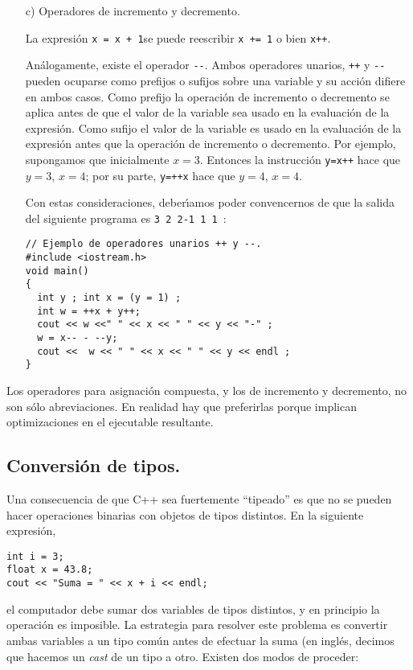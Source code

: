 \begin{enumerate}
La expresi{\'o}n \quad \verb!x = x + 2!\quad se puede reemplazar por \quad
\verb!x += 2!.

Existen los operadores \quad \verb|+=    -=    *=    /=|

\item[c)] Operadores de incremento y decremento.

La expresi{\'o}n \quad \verb|x = x + 1|\quad se puede reescribir \quad
\verb|x += 1| \quad o bien \quad \verb|x++|.

An{\'a}logamente, existe el operador \verb+--+. Ambos operadores unarios,
\verb|++| y \verb|--| pueden ocuparse como prefijos o sufijos sobre
una variable y su acci{\'o}n difiere en ambos casos. Como prefijo la
operaci{\'o}n de incremento o decremento se aplica antes de que el valor
de la variable sea usado en la evaluaci{\'o}n de la expresi{\'o}n. Como sufijo
el valor de la variable es usado en la evaluaci{\'o}n de la expresi{\'o}n
antes que la operaci{\'o}n de incremento o decremento. 
Por ejemplo, supongamos que inicialmente
$x=3$. Entonces la instrucci\'on \verb-y=x++- hace que $ y=3$, $x
=4$; por su parte, \verb-y=++x- hace que $y=4$, $x=4$.

Con estas consideraciones, deber\'{\i}amos poder convencernos de que
la salida del siguiente programa es \verb+3 2 2-1 1 1 +:
\begin{verbatim}
// Ejemplo de operadores unarios ++ y --.
#include <iostream.h>
void main()
{
  int y ; int x = (y = 1) ;
  int w = ++x + y++;
  cout << w <<" " << x << " " << y << "-" ; 
  w = x-- - --y;
  cout <<  w << " " << x << " " << y << endl ; 
}
\end{verbatim}

\end{enumerate}

Los operadores para asignaci\'on compuesta, y los de incremento y
decremento, no son s\'olo abreviaciones. En realidad hay que
preferirlas porque implican optimizaciones en el ejecutable resultante. 

\subsection{Conversi{\'o}n de tipos.}
\label{cast}

Una consecuencia de que C++ sea fuertemente ``tipeado'' es que no se
pueden hacer operaciones binarias con objetos de tipos distintos.
En la siguiente expresi\'on,
\begin{verbatim}
int i = 3;
float x = 43.8;
cout << "Suma = " << x + i << endl;
\end{verbatim}
el computador debe sumar dos variables de tipos distintos, y en
principio la operaci\'on es imposible. La estrategia para resolver
este problema es convertir ambas variables 
a un tipo com{\'u}n antes de efectuar la
suma (en ingl\'es, decimos que hacemos un {\em cast\/} de un tipo a
otro. 
Existen dos modos de proceder:

